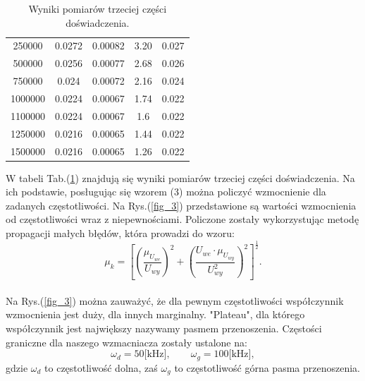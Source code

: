 \documentclass[10pt,a4paper]{article}
\begin{document}
\begin{table}[htp!]
\begin{center}
\begin{tabular}{|c|c|c|c|c|}
250000                             & 0.0272                                & 0.00082                                     & 3.20                                        & 0.027                                       \\
500000                             & 0.0256                                & 0.00077                                     & 2.68                                        & 0.026                                       \\
750000                             & 0.024                                 & 0.00072                                     & 2.16                                        & 0.024                                       \\
1000000                            & 0.0224                                & 0.00067                                     & 1.74                                        & 0.022                                       \\
1100000                            & 0.0224                                & 0.00067                                     & 1.6                                         & 0.022                                       \\
1250000                            & 0.0216                                & 0.00065                                     & 1.44                                        & 0.022                                       \\
1500000                            & 0.0216                                & 0.00065                                     & 1.26                                        & 0.022                  \\
\hline                    
\end{tabular}
\end{center}
\caption{Wyniki pomiarów trzeciej części doświadczenia.}
\label{czesc3}
\end{table}
W tabeli Tab.(\ref{czesc3}) znajdują się wyniki pomiarów trzeciej części doświadczenia. Na ich podstawie, posługując się wzorem (3) można policzyć wzmocnienie dla zadanych częstotliwości. Na Rys.(\ref{fig_3}) przedstawione są wartości wzmocnienia od częstotliwości wraz z niepewnościami. Policzone zostały wykorzystując metodę propagacji małych błędów, która prowadzi do wzoru:
$$ \mu_k = [ (\frac{\mu_{U_{we}}}{U_{wy}})^2 + ( \frac{U_{we}\cdot \mu_{U_{wy}}}{U_{wy}^2} )^2 ]^{\frac{1}{2}}.$$ \\
Na Rys.(\ref{fig_3}) można zauważyć, że dla pewnym częstotliwości współczynnik wzmocnienia jest duży, dla innych marginalny. "Plateau", dla którego współczynnik jest największy nazywamy pasmem przenoszenia. Częstości graniczne dla naszego wzmacniacza zostały ustalone na:
$$ \omega_d = 50 \text{[kHz]}, \qquad \omega_g = 100 \text{[kHz]}, $$
gdzie $\omega_d$ to częstotliwość dolna, zaś $\omega_g$ to częstotliwość górna pasma przenoszenia.
\end{document}
